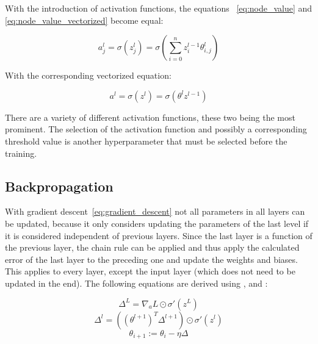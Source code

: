 With the introduction of activation functions, the equations ~\eqref{eq:node_value} and \eqref{eq:node_value_vectorized} become equal:

\begin{equation}
    a^l_j = \sigma(z^l_j) = \sigma(\sum^n_{i=0}z^{l-1}_i\theta^l_{i, j})
    \label{eq:activation}
\end{equation}

With the corresponding vectorized equation:

\begin{equation}
    a^l = \sigma(z^l) = \sigma(\theta^l z^{l-1})
    \label{eq:activation_vectorized}
\end{equation}

There are a variety of different activation functions, these two being the most prominent.
The selection of the activation function and possibly a corresponding threshold value is another hyperparameter that must be selected before the training.

\subsection{Backpropagation}

With gradient descent~\eqref{eq:gradient_descent} not all parameters in all layers can be updated, because it only considers updating the parameters of the last level if it is considered independent of previous layers.
Since the last layer is a function of the previous layer, the chain rule can be applied and thus apply the calculated error of the last layer to the preceding one and update the weights and biases. This applies to every layer, except the input layer (which does not need to be updated in the end).
The following equations are derived using \cite[p.733]{StuartRussell2018}, \cite[p.197]{Goodfellow2017} and \cite[ch.2]{Nielsen2015}:

\begin{equation}
    \varDelta^L = \nabla_a L \odot \sigma'(z^L)
    \label{eq:output_error}
\end{equation}
\begin{equation}
    \varDelta^l = ((\theta^{l+1})^T \varDelta^{l+1}) \odot \sigma'(z^l)
    \label{eq:hidden_error}
\end{equation}
\begin{equation}
    \theta_{i+1} := \theta_i - \eta \varDelta
    \label{eq:backprop_update}
\end{equation}

